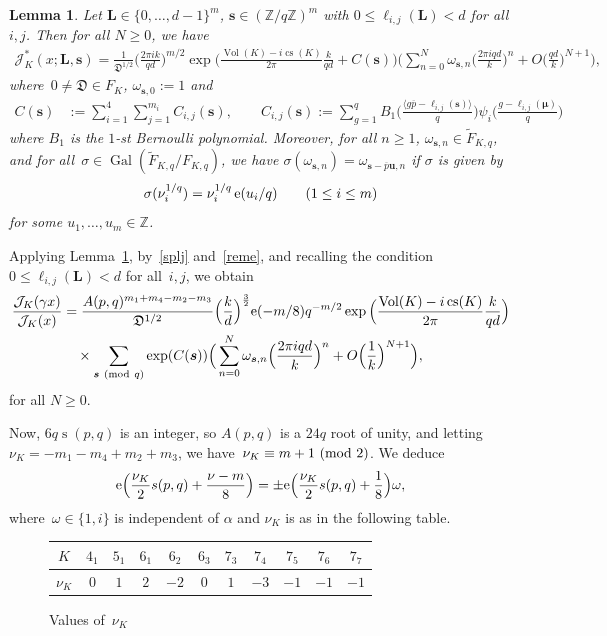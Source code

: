 \documentclass[11pt]{amsart}
\newcommand{\Z}{\mathbb{Z}}
\newcommand{\ang}[1]{\langle#1\rangle}
\newcommand{\J}{\mathcal{J}}
\renewcommand{\mod}[1]{~\pr{\textnormal{mod}~#1}}
\newcommand{\hessK}{{\mathfrak D}}
\newtheorem{lemma}{Lemma}
\theoremstyle{definition}
\newcommand{\pr}[1]{\mathchoice{\left( #1\right)}{(#1)}{(#1)}{(#1)}}
\newcommand{\e}[1][]{\ifthenelse{\equal{#1}{}}{{\rm e}}{\operatorname{e}\pr{ #1}}}
\newcommand{\Gal}{\operatorname*{Gal}}
\DeclareMathOperator{\Vol}{Vol}
\DeclareMathOperator{\cs}{cs}
\newcommand{\bs}{\boldsymbol }
\DeclareMathOperator{\deks}{s}
\newcommand{\1}{{\mathbf 1}}
\renewcommand{\bar}[1]{\overline{#1}}
\let\originalleft\left
\let\originalright\right
\renewcommand{\left}{\mathopen{}\mathclose\bgroup\originalleft}
\renewcommand{\right}{\aftergroup\egroup\originalright}
\numberwithin{equation}{section}
\begin{document}
\begin{lemma}\label{main_terms}
  Let $\bs L\in\{0,\dots, d-1\}^m$, $\bs s\in(\Z/q\Z)^m$ with $0\leq \ell_{i,j}(\bs L)<d$ for all $i,j$. Then for all $N\geq0$, we have
  \begin{align*}
    \J^{*}_K(x ; \boldsymbol L,\boldsymbol s) =\frac1{\hessK^{1/2}} \Big(\frac{2\pi ik}{ qd}\Big)^{m/2}\exp\Big(\frac{\Vol (K)-i\cs (K)}{2\pi}\frac{k}{qd}+C(\bs s)\Big)\Big(\sum_{n=0}^N\omega_{\bs s,n}\Big(\frac{2\pi i qd}{k}\Big)^n+O\Big(\frac{qd}{k}\Big)^{N+1}\Big),
  \end{align*}
  where~$0\neq \hessK \in F_{K}$, $\omega_{\bs s,0}:=1$ and
  \begin{align}\label{defcs}
    C(\bs s)&:=\sum_{i=1}^4\sum_{j=1}^{m_i}C_{i,j}(\bs s), \qquad C_{i,j}(\bs s):=\sum_{g=1}^q B_1\Big(\frac{\ang{g\bar{p}-\ell_{i,j}(\bs s)}}q\Big) \psi_i\Big(\frac{g-\ell_{i,j}(\bs\mu)}q\Big)
  \end{align}
  where $B_1$ is the $1$-st Bernoulli polynomial.
  Moreover, for all $n\geq1$, $\omega_{\bs s,n}\in {\tilde F}_{K,q}$, and for all~$\sigma\in\Gal({\tilde F}_{K,q} / F_{K,q})$, we have $\sigma(\omega_{\bs s,n})=\omega_{\bs s-\overline p \bs u,n}$ if $\sigma$ is given by
  \begin{align}\label{galau}
    \sigma(\nu_i^{1/q})=\nu_i^{1/q}\e[u_i/q] \qquad (1\leq i \leq m)
  \end{align}
  for some $u_1,\dots,u_m\in\Z$.
\end{lemma}
Applying Lemma~\ref{main_terms}, by~\eqref{splj} and~\eqref{reme}, and recalling the condition $0\leq \ell_{i,j}(\bs L)<d$ for all~$i,j$, we obtain
\begin{align*}
  \frac{ \J_{K}(\gamma x)}{ \J_{K}( x)}& =  \frac{A(p,q)^{m_1+m_4-m_2-m_3}}{\hessK^{1/2}} \Big(\frac{ k}{ d}\Big)^{\frac32} \e(-m/8) q^{-m/2}  \exp\Big(\frac{\Vol (K)-i\cs (K)}{2\pi}\frac{k}{qd}\Big)\\
  &\quad\times\sum_{\bs s \mod q}\exp(C(\bs s))\Big(\sum_{n=0}^N\omega_{\bs s,n}\Big(\frac{2\pi iqd}{k}\Big)^n+O\Big(\frac{1}{k}\Big)^{N+1}\Big),
\end{align*}
for all $N\geq0$. 

Now, $6q \deks(p,q)$ is an integer, so $A(p,q)$ is a $24q$ root of unity, and letting~$\nu_K = -m_1-m_4+m_2+m_3$, we have~$\nu_K \equiv m+1\mod{2}$. We deduce
$$ 
\e\Big(\frac{\nu_K}2 s(p, q) + \frac{\nu-m}8\Big) = \pm \e\Big(\frac{\nu_K}2s(p, q)+\frac18\Big) \omega,
 $$
where~$\omega \in \{1, i\}$ is independent of $\alpha$ and $\nu_K$ is as in the following table.
\begin{figure}[H]
  \centering
  \begin{tabular}{|c|c|c|c|c|c|c|c|c|c|c|}
    \hline
    $K$ & $4_1$ & $5_1$ & $6_1$ & $6_2$ & $6_3$ & $7_3$ & $7_4$ & $7_5$ & $7_6$ & $7_7$ \\
    \hline
    $\nu_K$ & $0$ & $1$ & $2$ & $-2$ & $0$ & $1$ & $-3$ & $-1$ & $-1$ & $-1$ \\
    \hline
  \end{tabular}
  \caption{Values of~$\nu_K$}
  \label{fig:nuK}
\end{figure}
\end{document}
